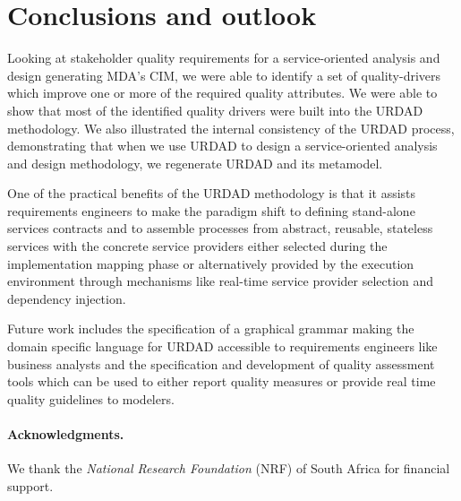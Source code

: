 \section{Conclusions and outlook}

Looking at stakeholder quality requirements for a service-oriented analysis and design generating MDA's CIM, we were able to identify a set of quality-drivers which improve one or more of the required quality attributes. We were able to show that most of the identified quality drivers were built into the URDAD methodology. We also illustrated the internal consistency of the URDAD process, demonstrating that when we use URDAD to design a service-oriented analysis and design methodology, we regenerate URDAD and its metamodel.

One of the practical benefits of the URDAD methodology is that it assists requirements engineers to make the paradigm shift\cite{haines_impact_2007} to defining stand-alone services contracts and to assemble processes from abstract, reusable, stateless services with the concrete service providers either selected during the implementation mapping phase or alternatively provided by the execution environment through mechanisms like real-time service provider selection and dependency injection.

Future work includes the specification of a graphical grammar making the domain specific language for URDAD accessible to requirements engineers like business analysts and the specification and development of quality assessment tools which can be used to either report quality measures or provide real time quality guidelines to modelers.

\paragraph{Acknowledgments.} We thank the \emph{National Research 
Foundation} (NRF) of South Africa for financial support.
